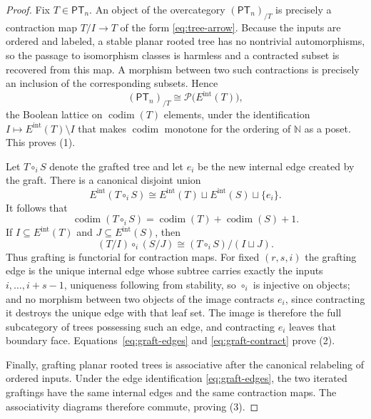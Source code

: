 \documentclass[11pt,letterpaper,twoside]{article}
\theoremstyle{plain}
\theoremstyle{definition}
\theoremstyle{remark}
\begin{document}
\begin{proof}
Fix \(T\in\mathsf{PT}_n\).  An object of the overcategory \((\mathsf{PT}_n)_{/T}\) is precisely a contraction map \(T/I\to T\) of the form \eqref{eq:tree-arrow}.  Because the inputs are ordered and labeled, a stable planar rooted tree has no nontrivial automorphisms, so the passage to isomorphism classes is harmless and a contracted subset is recovered from this map.  A morphism between two such contractions is precisely an inclusion of the corresponding subsets.  Hence
\[
 (\mathsf{PT}_n)_{/T}\cong
 \mathcal P\bigl(E^{\mathrm{int}}(T)\bigr),
\]
the Boolean lattice on \(\operatorname{codim}(T)\) elements, under the identification \(I\mapsto E^{\mathrm{int}}(T)\setminus I\) that makes \(\operatorname{codim}\) monotone for the ordering of \(\mathbb N\) as a poset.  This proves (1).

Let \(T\circ_i S\) denote the grafted tree and let \(e_i\) be the new internal edge created by the graft.  There is a canonical disjoint union
\begin{equation}\label{eq:graft-edges}
 E^{\mathrm{int}}(T\circ_i S)
 \cong E^{\mathrm{int}}(T)\sqcup
 E^{\mathrm{int}}(S)\sqcup\{e_i\}.
\end{equation}
It follows that
\[
 \operatorname{codim}(T\circ_iS)
 =\operatorname{codim}(T)+\operatorname{codim}(S)+1.
\]
If \(I\subseteq E^{\mathrm{int}}(T)\) and
\(J\subseteq E^{\mathrm{int}}(S)\), then
\begin{equation}\label{eq:graft-contract}
 (T/I)\circ_i(S/J)
 \cong (T\circ_iS)/(I\sqcup J).
\end{equation}
Thus grafting is functorial for contraction maps.  For fixed \((r,s,i)\) the grafting edge is the unique internal edge whose subtree carries exactly the inputs \(i,\ldots,i+s-1\), uniqueness following from stability, so \(\circ_i\) is injective on objects; and no morphism between two objects of the image contracts \(e_i\), since contracting it destroys the unique edge with that leaf set.  The image is therefore the full subcategory of trees possessing such an edge, and contracting \(e_i\) leaves that boundary face.  Equations~\eqref{eq:graft-edges} and \eqref{eq:graft-contract} prove (2).

Finally, grafting planar rooted trees is associative after the canonical relabeling of ordered inputs.  Under the edge identification \eqref{eq:graft-edges}, the two iterated graftings have the same internal edges and the same contraction maps.  The associativity diagrams therefore commute, proving (3).
\end{proof}
\end{document}
